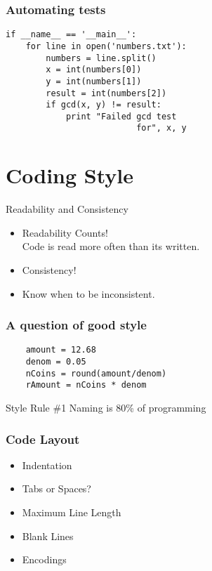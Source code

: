\documentclass[compress,14pt]{beamer}
\begin{document}
\begin{frame}[fragile]
  \frametitle{Automating tests}
  \begin{lstlisting}
if __name__ == '__main__':
    for line in open('numbers.txt'):
        numbers = line.split()
        x = int(numbers[0])
        y = int(numbers[1])
        result = int(numbers[2])
        if gcd(x, y) != result:
            print "Failed gcd test
                          for", x, y
  \end{lstlisting}  
\end{frame}

\section{Coding Style}
\begin{frame}{Readability and Consistency}
    \begin{itemize}
        \item Readability Counts!\\Code is read more often than its written.
        \item Consistency!
        \item Know when to be inconsistent.
      \end{itemize}
\end{frame}

\begin{frame}[fragile] \frametitle{A question of good style}
  \begin{lstlisting}
    amount = 12.68
    denom = 0.05
    nCoins = round(amount/denom)
    rAmount = nCoins * denom
  \end{lstlisting}
  \pause
  \begin{block}{Style Rule \#1}
    Naming is 80\% of programming
  \end{block}
\end{frame}

\begin{frame}[fragile]
  \frametitle{Code Layout}
  \begin{itemize}
        \item Indentation
        \item Tabs or Spaces?
        \item Maximum Line Length
        \item Blank Lines
        \item Encodings
   \end{itemize}
\end{frame}
\end{document}
